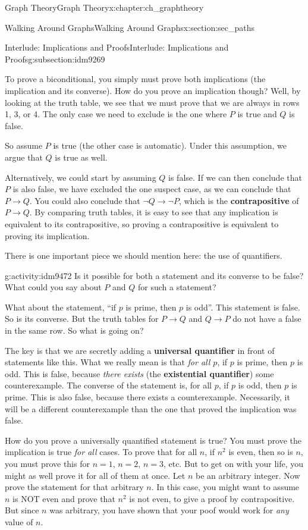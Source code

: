 \documentclass[oneside,10pt,]{book}
\newcommand{\terminology}[1]{\textbf{#1}}
\numberwithin{equation}{chapter}
\def\imp{\rightarrow}
\begin{document}
\begin{chapterptx}{Graph Theory}{}{Graph Theory}{}{}{x:chapter:ch_graphtheory}
\begin{sectionptx}{Walking Around Graphs}{}{Walking Around Graphs}{}{}{x:section:sec_paths}
\begin{subsectionptx}{Interlude: Implications and Proofs}{}{Interlude: Implications and Proofs}{}{}{g:subsection:idm9269}
\par
To prove a biconditional, you simply must prove both implications (the implication and its converse).  How do you prove an implication though?  Well, by looking at the truth table, we see that we must prove that we are always in rows 1, 3, or 4.  The only case we need to exclude is the one where \(P\) is true and \(Q\) is false.%
\par
So assume \(P\) is true (the other case is automatic).  Under this assumption, we argue that \(Q\) is true as well.%
\par
Alternatively, we could start by assuming \(Q\) is false.  If we can then conclude that \(P\) is also false, we have excluded the one suspect case, as we can conclude that \(P \imp Q\).  You could also conclude that \(\neg Q \imp \neg P\), which is the \terminology{contrapositive} of \(P \imp Q\).  By comparing truth tables, it is easy to see that any implication is equivalent to its contrapositive, so proving a contrapositive is equivalent to proving its implication.%
\par
There is one important piece we should mention here: the use of quantifiers.%
\begin{activity}{}{g:activity:idm9472}%
Is it possible for both a statement and its converse to be false?  What could you say about \(P\) and \(Q\) for such a statement?%
\end{activity}
What about the statement, ``if \(p\) is prime, then \(p\) is odd''.  This statement is false.  So is its converse.  But the truth tables for \(P \imp Q\) and \(Q \imp P\) do not have a false in the same row.  So what is going on?%
\par
The key is that we are secretly adding a \terminology{universal quantifier} in front of statements like this.  What we really mean is that \emph{for all \(p\)}, if \(p\) is prime, then \(p\) is odd.  This is false, because \emph{there exists} (the \terminology{existential quantifier}) some counterexample.  The converse of the statement is, for all \(p\), if \(p\) is odd, then \(p\) is prime.  This is also false, because there exists a counterexample.  Necessarily, it will be a different counterexample than the one that proved the implication was false.%
\par
How do you prove a universally quantified statement is true?  You must prove the implication is true \emph{for all} cases.  To prove that for all \(n\), if \(n^2\) is even, then so is \(n\), you must prove this for \(n = 1\), \(n = 2\), \(n =3\), etc.  But to get on with your life, you might as well prove it for all of them at once.  Let \(n\) be an arbitrary integer.  Now prove the statement for that arbitrary \(n\).  In this case, you might want to assume \(n\) is NOT even and prove that \(n^2\) is not even, to give a proof by contrapositive.  But since \(n\) was arbitrary, you have shown that your poof would work for \emph{any} value of \(n\).%

\end{subsectionptx}
\end{sectionptx}
\end{chapterptx}
\end{document}
